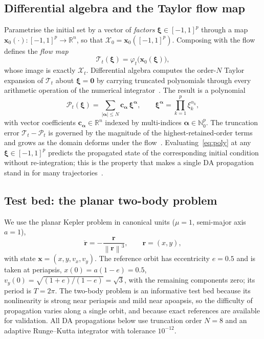 \documentclass[11pt]{article}
\newcommand{\R}{\mathbb{R}}
\newcommand{\bx}{\bm{x}}
\newcommand{\bxi}{\bm{\xi}}
\newcommand{\norm}[1]{\left\lVert#1\right\rVert}
\newcommand{\abs}[1]{\left\lvert#1\right\rvert}
\begin{document}
\subsection{Differential algebra and the Taylor flow map}
\label{sec:da}

Parametrise the initial set by a vector of \emph{factors}
$\bxi \in [-1,1]^p$ through a map $\bx_0(\cdot) : [-1,1]^p \to \R^n$, so that
$\mathcal{X}_0 = \bx_0([-1,1]^p)$. Composing with the flow defines the
\emph{flow map}
\begin{equation}
  \mathcal{T}_t(\bxi) = \varphi_t\big(\bx_0(\bxi)\big),
  \label{eq:flowmap}
\end{equation}
whose image is exactly $\mathcal{X}_t$. Differential algebra computes the
order-$N$ Taylor expansion of $\mathcal{T}_t$ about $\bxi = \bm{0}$ by carrying
truncated polynomials through every arithmetic operation of the numerical
integrator~\citep{berz1999modern}. The result is a polynomial
\begin{equation}
  \mathcal{P}_t(\bxi) = \sum_{\abs{\bm{\alpha}} \le N}
    \bm{c}_{\bm{\alpha}}\, \bxi^{\bm{\alpha}},
  \qquad \bxi^{\bm{\alpha}} = \prod_{k=1}^{p} \xi_k^{\alpha_k},
  \label{eq:poly}
\end{equation}
with vector coefficients $\bm{c}_{\bm{\alpha}} \in \R^n$ indexed by multi-indices
$\bm{\alpha} \in \mathbb{N}_0^p$. The truncation error
$\mathcal{T}_t - \mathcal{P}_t$ is governed by the magnitude of the
highest-retained-order terms and grows as the domain deforms under the
flow~\citep{wittig2015propagation}. Evaluating~\eqref{eq:poly} at any
$\bxi \in [-1,1]^p$ predicts the propagated state of the corresponding initial
condition without re-integration; this is the property that makes a single DA
propagation stand in for many trajectories~\citep{valli2013nonlinear}.

\subsection{Test bed: the planar two-body problem}
\label{sec:twobody}

We use the planar Kepler problem in canonical units
($\mu = 1$, semi-major axis $a = 1$),
\begin{equation}
  \ddot{\bm{r}} = -\frac{\bm{r}}{\norm{\bm{r}}^3}, \qquad
  \bm{r} = (x, y),
  \label{eq:kepler}
\end{equation}
with state $\bx = (x, y, v_x, v_y)$. The reference orbit has eccentricity
$e = 0.5$ and is taken at periapsis,
$x(0) = a(1-e) = 0.5$, $v_y(0) = \sqrt{(1+e)/(1-e)} = \sqrt{3}$, with the
remaining components zero; its period is $T = 2\pi$. The two-body problem is an
informative test bed because its nonlinearity is strong near periapsis and mild
near apoapsis, so the difficulty of propagation varies along a single orbit, and
because exact references are available for validation. All DA propagations below
use truncation order $N = 8$ and an adaptive Runge--Kutta integrator with
tolerance $10^{-12}$.
\end{document}
